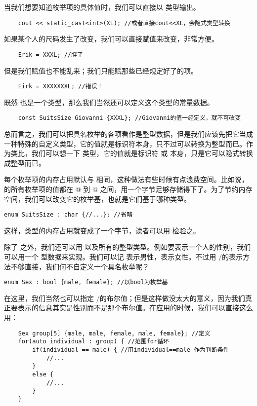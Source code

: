 当我们想要知道枚举项的具体值时，我们可以直接以 \lstinline@int@ 类型输出。
\begin{lstlisting}
    cout << static_cast<int>(XL); //或者直接cout<<XL，会隐式类型转换
\end{lstlisting}\par
如果某个人的尺码发生了改变，我们可以直接赋值来改变，非常方便。
\begin{lstlisting}
    Erik = XXXL; //胖了
\end{lstlisting}
但是我们赋值也不能乱来；我们只能赋那些已经规定好了的项。
\begin{lstlisting}
    Eirk = XXXXXXXL; //错误！
\end{lstlisting}
既然 \lstinline@SuitsSize@ 也是一个类型，那么我们当然还可以定义这个类型的常量数据。
\begin{lstlisting}
    const SuitsSize Giovanni {XXXL}; //Giovanni的值一经定义，就不可改变
\end{lstlisting}\par
总而言之，我们可以把具名枚举的各项看作是整型数据，但是我们应该先把它当成一种特殊的自定义类型，它的值就是标识符本身，只不过可以转换为整型而已。作为类比，我们可以想一下 \lstinline@bool@ 类型，它的值就是标识符 \lstinline@true@ 或 \lstinline@false@ 本身，只是它可以隐式转换成整型而已。\par
每个枚举项的内存占用默认与 \lstinline@int@ 相同，这种做法有些时候有点浪费空间。比如说，\lstinline@SuitsSize@ 的所有枚举项的值都在 @ 到 @ 之间，用一个字节足够存储得下了。为了节约内存空间，我们可以改变它的枚举基，也就是它们基于哪种类型。
\begin{lstlisting}
enum SuitsSize : char {//...}; //省略
\end{lstlisting}
这样，\lstinline@SuitsSize@ 类型的内存占用就变成了一个字节，读者可以用 \lstinline@sizeof@ 检验之。\par
除了 \lstinline@char@ 之外，我们还可以用 \lstinline@bool@ 以及所有的整型类型。例如要表示一个人的性别，我们可以用一个 \lstinline@bool@ 型数据来实现。我们可以记 \lstinline@true@ 表示男性，\lstinline@false@ 表示女性。不过用 \lstinline@true@/\lstinline@false@ 的表示方法不够直接，我们何不自定义一个具名枚举呢？
\begin{lstlisting}
enum Sex : bool {male, female}; //以bool为枚举基
\end{lstlisting}
在这里，我们当然也可以指定 \lstinline@male@/\lstinline@female@ 的布尔值；但是这样做没太大的意义，因为我们真正要表示的信息其实是性别而不是那个布尔值。在应用的时候，我们可以直接这么用：
\begin{lstlisting}
    Sex group[5] {male, male, female, male, female}; //定义
    for(auto individual : group) { //范围for循环
        if(individual == male) { //用individual==male 作为判断条件
            //...
        }
        else {
            //...
        }
    }
\end{lstlisting}
